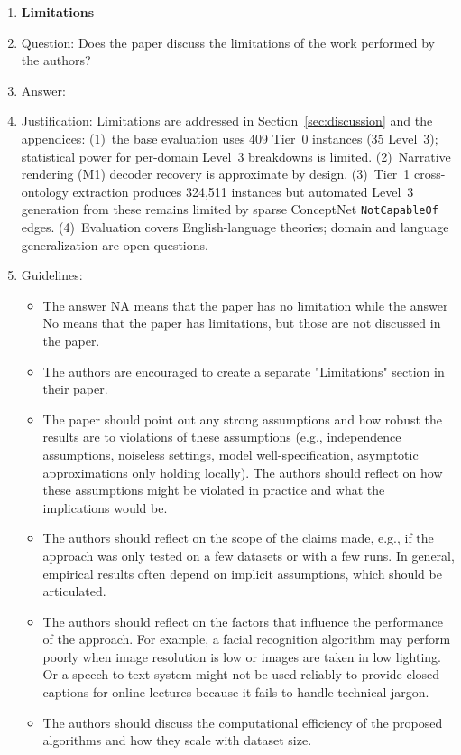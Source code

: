 \documentclass{article}
\theoremstyle{definition}
\begin{document}
\begin{enumerate}
\item {\bf Limitations}
    \item[] Question: Does the paper discuss the limitations of the work performed by the authors?
    \item[] Answer: \answerYes{}
    \item[] Justification: Limitations are addressed in Section~\ref{sec:discussion} and the appendices: (1)~the base evaluation uses 409 Tier~0 instances (35 Level~3); statistical power for per-domain Level~3 breakdowns is limited. (2)~Narrative rendering (M1) decoder recovery is approximate by design. (3)~Tier~1 cross-ontology extraction produces 324,511 instances but automated Level~3 generation from these remains limited by sparse ConceptNet \texttt{NotCapableOf} edges. (4)~Evaluation covers English-language theories; domain and language generalization are open questions.
    \item[] Guidelines:
    \begin{itemize}
        \item The answer NA means that the paper has no limitation while the answer No means that the paper has limitations, but those are not discussed in the paper. 
        \item The authors are encouraged to create a separate "Limitations" section in their paper.
        \item The paper should point out any strong assumptions and how robust the results are to violations of these assumptions (e.g., independence assumptions, noiseless settings, model well-specification, asymptotic approximations only holding locally). The authors should reflect on how these assumptions might be violated in practice and what the implications would be.
        \item The authors should reflect on the scope of the claims made, e.g., if the approach was only tested on a few datasets or with a few runs. In general, empirical results often depend on implicit assumptions, which should be articulated.
        \item The authors should reflect on the factors that influence the performance of the approach. For example, a facial recognition algorithm may perform poorly when image resolution is low or images are taken in low lighting. Or a speech-to-text system might not be used reliably to provide closed captions for online lectures because it fails to handle technical jargon.
        \item The authors should discuss the computational efficiency of the proposed algorithms and how they scale with dataset size.

\end{itemize}
\end{enumerate}
\end{document}
